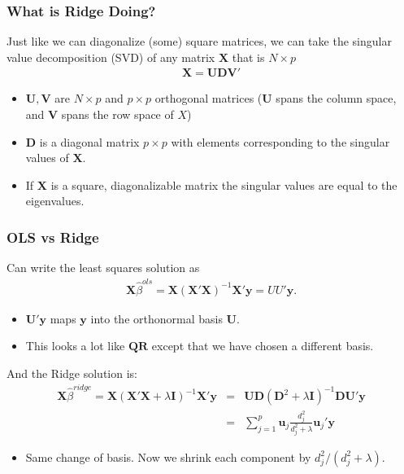 \begin{frame}
    \frametitle{What is Ridge Doing?}
    Just like we can diagonalize (some) square matrices, we can take the \alert{singular value decomposition} (SVD) of any matrix $\mathbf{X}$ that is $N \times p$
    \begin{eqnarray*}
    \mathbf{X}=\mathbf{U} \mathbf{D} \mathbf{V}'
    \end{eqnarray*}
    \begin{itemize}
    \item $\mathbf{U}, \mathbf{V}$ are $N \times p$ and $p \times p$ orthogonal matrices ($\mathbf{U}$ spans the column space, and $\mathbf{V}$ spans the row space of $X$)
    \item $\mathbf{D}$ is a diagonal matrix $p \times p$ with elements corresponding to the singular values of $\mathbf{X}$.
    \item If $\mathbf{X}$ is a square, diagonalizable matrix the singular values are equal to the eigenvalues.
    \end{itemize}
\end{frame}
    
\begin{frame}
    \frametitle{OLS vs Ridge}
    Can write the least squares solution as
    \begin{eqnarray*}
    \mathbf{X} \hat{\beta}^{ols} = \mathbf{X} (\mathbf{X}'\mathbf{X})^{-1} \mathbf{X}' \mathbf{y} = U U' \mathbf{y}.
    \end{eqnarray*}
    \vspace{-15 pt}

    \begin{itemize}
    \item $\mathbf{U}' \mathbf{y}$ maps $\mathbf{y}$ into the orthonormal basis $\mathbf{U}$.
    \item This looks a lot like $\mathbf{QR}$ except that we have chosen a different basis.
    \end{itemize}

    \pause 

    And the Ridge solution is:
    \begin{eqnarray*}
    \mathbf{X} \hat{\beta}^{ridge} = \mathbf{X} (\mathbf{X}'\mathbf{X} + \lambda \mathbf{I})^{-1} \mathbf{X}' \mathbf{y} &=& \mathbf{U D} (\mathbf{D}^2 + \lambda \mathbf{I})^{-1} \mathbf{D} \mathbf{U}' \mathbf{y}\\
    &=& \sum_{j=1}^p \mathbf{u}_j  \frac{d_j^2}{d_j^2 + \lambda} \mathbf{u}_j' \mathbf{y}
    \end{eqnarray*}
    \begin{itemize}
    \item Same change of basis. Now we shrink each component by $d_j^2/(d_j^2 + \lambda)$.
    \end{itemize}
\end{frame}

